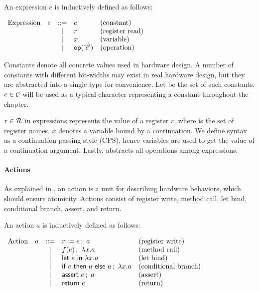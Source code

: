 \begin{definition}
  \label{def-expression}
  An expression $e$ is inductively defined as follows:
  \begin{center}
    \begin{math}
      \begin{array}{rcll}
        \textrm{Expression}\quad e & ::= & c & \textrm{(constant)} \\
        & | & r & \textrm{(register read)} \\
        & | & x & \textrm{(variable)} \\
        & | & \eop{e} & \textrm{(operation)} \\
      \end{array}
    \end{math}
  \end{center}
\end{definition}

Constants denote all concrete values used in hardware design. A number
of constants with different bit-widths may exist in real hardware
design, but they are abstracted into a single type for
convenience. Let \setconst{} be the set of such constants. $c \in
\setconst{}$ will be used as a typical character representing a
constant throughout the chapter.

$r \in \setregs{}$ in expressions represents the value of a register
$r$, where \setregs{} is the set of register names. $x$ denotes a
variable bound by a continuation. We define syntax as a
continuation-passing style (CPS), hence variables are used to get the
value of a continuation argument. Lastly,  abstracts all
operations among expressions.

\paragraph{Actions}
As explained in , an action is a unit for
describing hardware behaviors, which should ensure atomicity. Actions
consist of register write, method call, let bind, conditional branch,
assert, and return.

\begin{definition}
  \label{def-action}
  An action $a$ is inductively defined as follows:
  \begin{center}
    \begin{math}
      \begin{array}{rcll}
        \textrm{Action}\quad a & ::= & \actwrite{r}{e}{a} & \textrm{(register write)} \\
        & | & \actcall{x}{f}{e}{a} & \textrm{(method call)} \\
        & | & \actlet{e}{x}{a} & \textrm{(let bind)} \\
        & | & \actifelse{e}{a}{a}{x}{a} & \textrm{(conditional branch)} \\
        & | & \actassert{e}{a} & \textrm{(assert)} \\
        & | & \actret{e} & \textrm{(return)} \\
      \end{array}
    \end{math}
  \end{center}
\end{definition}

